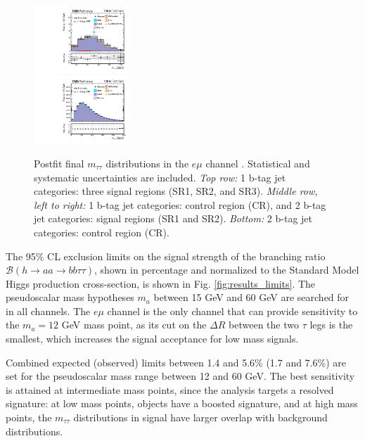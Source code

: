\begin{figure}[ht]
\begin{center}
        \includegraphics[width=0.32\textwidth]{figures/ch-13-results/em_all_6_post_prelim-yes.pdf}\\
        \includegraphics[width=0.32\textwidth]{figures/ch-13-results/em_all_7_post_prelim-yes.pdf}
    \end{center}
    \caption[Postfit final $m_{\tau\tau}$ distributions in the $e\mu$ channel.]{Postfit final $m_{\tau\tau}$ distributions in the $e\mu$ channel \cite{CMS-AN-20-213}. Statistical and systematic uncertainties are included. \textit{Top row:} 1 b-tag jet categories: three signal regions (SR1, SR2, and SR3). \textit{Middle row, left to right:} 1 b-tag jet categories: control region (CR), and 2 b-tag jet categories: signal regions (SR1 and SR2). \textit{Bottom:} 2 b-tag jet categories: control region (CR).}
    \label{fig:results_mtt_postfit_emall}
\end{figure}


The 95\% CL exclusion limits on the signal strength of the branching ratio $\mathcal{B}(h \rightarrow aa \rightarrow bb\tau\tau)$, shown in percentage and normalized to the Standard Model Higgs production cross-section, is shown in Fig. \ref{fig:results_limits}. The pseudoscalar mass hypotheses $m_a$ between 15 GeV and 60 GeV are searched for in all channels. The $e\mu$ channel is the only channel that can provide sensitivity to the $m_a = 12$ GeV mass point, as its cut on the $\Delta R$ between the two $\tau$ legs is the smallest, which increases the signal acceptance for low mass signals.

Combined expected (observed) limits between 1.4 and 5.6\% (1.7 and 7.6\%) are set for the pseudoscalar mass range between 12 and 60 GeV. The best sensitivity is attained at intermediate mass points, since the analysis targets a resolved signature: at low mass points, objects have a boosted signature, and at high mass points, the $m_{\tau\tau}$ distributions in signal have larger overlap with background distributions.

